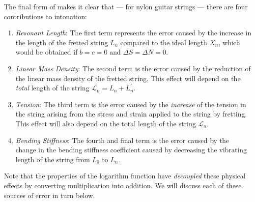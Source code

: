 The final form of  makes it clear that --- for nylon guitar strings --- there are four contributions to intonation:
 \begin{enumerate}
  \item
   \emph{Resonant Length}: The first term represents the error caused by the increase in the length of the fretted string $L_n$ compared to the ideal length $X_n$, which would be obtained if $b = c = 0$ and $\Delta S = \Delta N = 0$.
  \item
   \emph{Linear Mass Density}: The second term is the error caused by the reduction of the linear mass density of the fretted string. This effect will depend on the \emph{total} length of the string $\mathcal{L}_n = L_n + L^\prime_n$.
  \item
   \emph{Tension}: The third term is the error caused by the \emph{increase} of the tension in the string arising from the stress and strain applied to the string by fretting. This effect will also depend on the total length of the string $\mathcal{L}_n$.
  \item
   \emph{Bending Stiffness}: The fourth and final term is the error caused by the change in the bending stiffness coefficient caused by decreasing the vibrating length of the string from $L_0$ to $L_n$.
 \end{enumerate}
Note that the properties of the logarithm function have \emph{decoupled} these physical effects by converting multiplication into addition. We will discuss each of these sources of error in turn below.

